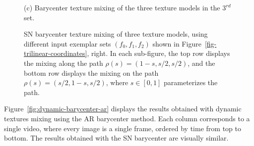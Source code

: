 \begin{figure}[ht!]
{%
(c) Barycenter texture mixing of the three texture models in the $3^{rd}$ set. \\
}
\caption{SN barycenter texture mixing of three texture models, using different input exemplar sets $(f_0, f_1, f_2)$ shown in Figure~\ref{fig-trilinear-coordinates}, right. In each sub-figure, the top row displays the mixing along the path $\rho(s) = (1-s, s/2, s/2)$, and the bottom row displays the mixing on the path $\rho(s) = (s/2, 1-s, s/2)$, where $s \in [0, 1]$ parameterizes the path.
}
\label{fig-OT-barycenter-SST}
\end{figure}


Figure~\ref{fig:dynamic-barycenter-ar} displays the results obtained with dynamic textures mixing using the AR barycenter method. Each column corresponds to a single video, where every image is a single frame, ordered by time from top to bottom. The results obtained with the SN barycenter are visually similar.



